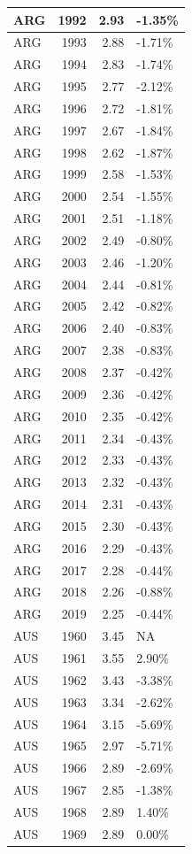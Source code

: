 \documentclass[
]{article}
\begin{document}
\begin{tabular}{l|r|r|l}
\hline
ARG & 1992 & 2.93 & -1.35\%\\
\hline
ARG & 1993 & 2.88 & -1.71\%\\
\hline
ARG & 1994 & 2.83 & -1.74\%\\
\hline
ARG & 1995 & 2.77 & -2.12\%\\
\hline
ARG & 1996 & 2.72 & -1.81\%\\
\hline
ARG & 1997 & 2.67 & -1.84\%\\
\hline
ARG & 1998 & 2.62 & -1.87\%\\
\hline
ARG & 1999 & 2.58 & -1.53\%\\
\hline
ARG & 2000 & 2.54 & -1.55\%\\
\hline
ARG & 2001 & 2.51 & -1.18\%\\
\hline
ARG & 2002 & 2.49 & -0.80\%\\
\hline
ARG & 2003 & 2.46 & -1.20\%\\
\hline
ARG & 2004 & 2.44 & -0.81\%\\
\hline
ARG & 2005 & 2.42 & -0.82\%\\
\hline
ARG & 2006 & 2.40 & -0.83\%\\
\hline
ARG & 2007 & 2.38 & -0.83\%\\
\hline
ARG & 2008 & 2.37 & -0.42\%\\
\hline
ARG & 2009 & 2.36 & -0.42\%\\
\hline
ARG & 2010 & 2.35 & -0.42\%\\
\hline
ARG & 2011 & 2.34 & -0.43\%\\
\hline
ARG & 2012 & 2.33 & -0.43\%\\
\hline
ARG & 2013 & 2.32 & -0.43\%\\
\hline
ARG & 2014 & 2.31 & -0.43\%\\
\hline
ARG & 2015 & 2.30 & -0.43\%\\
\hline
ARG & 2016 & 2.29 & -0.43\%\\
\hline
ARG & 2017 & 2.28 & -0.44\%\\
\hline
ARG & 2018 & 2.26 & -0.88\%\\
\hline
ARG & 2019 & 2.25 & -0.44\%\\
\hline
AUS & 1960 & 3.45 & NA\\
\hline
AUS & 1961 & 3.55 & 2.90\%\\
\hline
AUS & 1962 & 3.43 & -3.38\%\\
\hline
AUS & 1963 & 3.34 & -2.62\%\\
\hline
AUS & 1964 & 3.15 & -5.69\%\\
\hline
AUS & 1965 & 2.97 & -5.71\%\\
\hline
AUS & 1966 & 2.89 & -2.69\%\\
\hline
AUS & 1967 & 2.85 & -1.38\%\\
\hline
AUS & 1968 & 2.89 & 1.40\%\\
\hline
AUS & 1969 & 2.89 & 0.00\%\\
\hline
\end{tabular}
\end{document}
